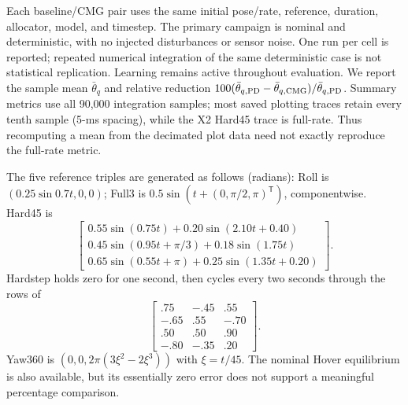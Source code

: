 \documentclass[letterpaper,10pt,conference]{IEEEtran}
\newcommand{\T}{^{\mathsf T}}
\begin{document}
Each baseline/CMG pair uses the same initial pose/rate, reference, duration,
allocator, model, and timestep. The primary campaign is nominal and
deterministic, with no injected disturbances or sensor noise. One run per
cell is reported; repeated numerical integration of the same deterministic
case is not statistical replication. Learning remains active throughout
evaluation. We report the sample mean $\bar\theta_q$ and relative reduction
$100(\bar\theta_{q,\rm PD}-\bar\theta_{q,\rm CMG})/\bar\theta_{q,\rm PD}$.
Summary metrics use all 90,000 integration samples; most saved plotting
traces retain every tenth sample (5-ms spacing), while the X2 Hard45
trace is full-rate. Thus recomputing a mean from
the decimated plot data need not exactly reproduce the full-rate metric.

The five reference triples are generated as follows (radians):
Roll is $(0.25\sin0.7t,0,0)$; Full3 is
$0.5\sin(t+(0,\pi/2,\pi)\T)$, componentwise. Hard45 is
\begin{equation}
 \begin{bmatrix}
 0.55\sin(0.75t)+0.20\sin(2.10t+0.40)\\
 0.45\sin(0.95t+\pi/3)+0.18\sin(1.75t)\\
 0.65\sin(0.55t+\pi)+0.25\sin(1.35t+0.20)
 \end{bmatrix}.
\end{equation}
Hardstep holds zero for one second, then cycles every two seconds through
the rows of
\begin{equation}
 \begin{bmatrix}
 .75&-.45&.55\\-.65&.55&-.70\\.50&.50&.90\\-.80&-.35&.20
 \end{bmatrix}.
\end{equation}
Yaw360 is $(0,0,2\pi(3\xi^2-2\xi^3))$ with $\xi=t/45$.
The nominal Hover equilibrium is also available, but its essentially zero
error does not support a meaningful percentage comparison.
\end{document}
